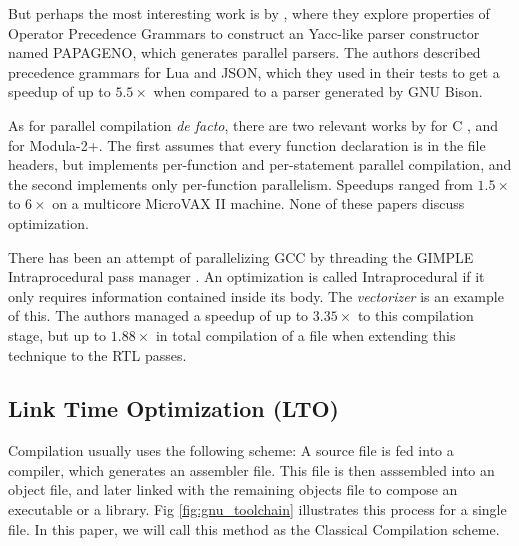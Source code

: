 \documentclass[runningheads]{llncs}
\begin{document}
But perhaps the most interesting work is by
\cite{Barenghi:2015:PPM:2839536.2840146}, where they explore properties of
Operator Precedence Grammars to construct an Yacc-like parser constructor named
PAPAGENO, which generates parallel parsers. The authors described
precedence grammars for Lua and JSON, which they used in their tests to get
a speedup of up to $5.5\times$ when compared to a parser generated by
GNU Bison.

As for parallel compilation \textit{de facto}, there are two relevant works by
\cite{vandevoorde1988parallel} for C , and \cite{wortman1992} for Modula-2+.
The first assumes that every function declaration is in the file headers, but
implements per-function and per-statement parallel compilation, and the second
implements only per-function parallelism.  Speedups ranged from $1.5\times$ to
$6\times$ on a multicore MicroVAX II machine. None of these papers discuss
optimization.

There has been an attempt of parallelizing GCC by threading the GIMPLE
Intraprocedural pass manager \cite{bernardino2020improving}. An optimization is
called Intraprocedural if it only requires information contained inside its body.
The \textit{vectorizer} is an example of this. The authors managed a speedup of up to
$3.35\times$ to this compilation stage, but up to $1.88\times$ in
total compilation of a file when extending this technique to the RTL passes.

\subsection{Link Time Optimization (LTO)} \label{lto_section}

Compilation usually uses the following scheme: A source file is fed into a compiler,
which generates an assembler file. This file is then asssembled into an object file,
and later linked with the remaining objects file to compose an executable or a library.
Fig \ref{fig:gnu_toolchain} illustrates this process for a single file. In this paper,
we will call this method as the Classical Compilation scheme.
\end{document}
